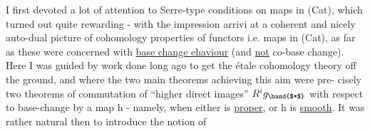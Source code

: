 I first devoted a lot of attention to Serre-type
conditions on maps in (Cat), which turned out quite rewarding - with
the impression  arrivi at a coherent and nicely auto-dual picture of
cohomology properties of functors i.e. maps in (Cat), as far as these
were concerned with \uline{base change ehaviour} (and \uline{not} co-base change). Here
I was guided by work done long ago to get the étale cohomology theory off
the ground, and where the two main theorems achieving this aim were pre-%
cisely two theorems of commutation of ``higher direct images'' $R^{i}g_{\hand{$*$}}$ with
respect to base-change by a map h - namely,  when either  is \uline{proper},
or h is \uline{smooth}. It was rather natural then to introduce the notion of

